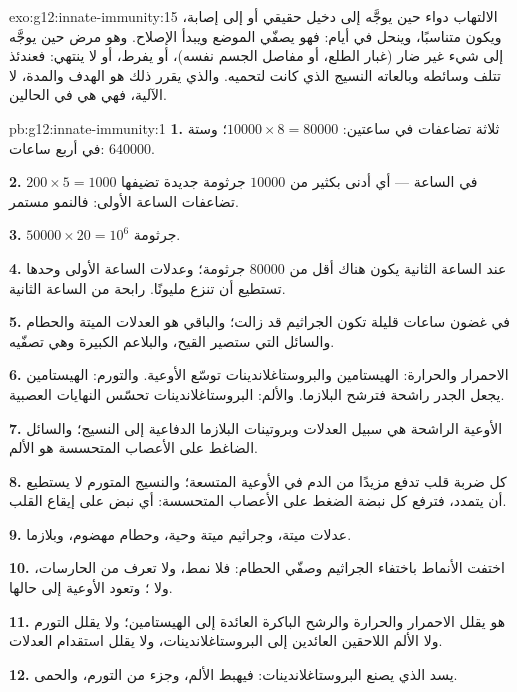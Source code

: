 \begin{solution}{exo:g12:innate-immunity:15}
الالتهاب دواء حين يوجَّه إلى دخيل حقيقي أو إلى إصابة، ويكون متناسبًا،
وينحل في أيام: فهو يصفّي الموضع ويبدأ الإصلاح. وهو مرض حين يوجَّه إلى
شيء غير ضار (غبار الطلع، أو مفاصل الجسم نفسه)، أو يفرط، أو لا ينتهي:
فعندئذ تتلف وسائطه وبالعاته النسيج الذي كانت لتحميه. والذي يقرر ذلك هو
الهدف والمدة، لا الآلية، فهي هي في الحالين.
\end{solution}

\begin{solution}{pb:g12:innate-immunity:1}
\textbf{1.} ثلاثة تضاعفات في ساعتين: $\num{10000} \times 8 =
\num{80000}$؛ وستة في أربع ساعات: $\num{640000}$.

\textbf{2.} $200 \times 5 = 1000$ في الساعة --- أي أدنى بكثير من
$\num{10000}$ جرثومة جديدة تضيفها تضاعفات الساعة الأولى: فالنمو
مستمر.

\textbf{3.} $\num{50000} \times 20 = 10^6$ جرثومة.

\textbf{4.} عند الساعة الثانية يكون هناك أقل من $\num{80000}$ جرثومة؛
وعدلات الساعة الأولى وحدها تستطيع أن تنزع مليونًا.  رابحة من
الساعة الثانية.

\textbf{5.} في غضون ساعات قليلة تكون الجراثيم قد زالت؛ والباقي هو
العدلات الميتة والحطام والسائل التي ستصير القيح، والبلاعم الكبيرة وهي
تصفّيه.

\textbf{6.} الاحمرار والحرارة: الهيستامين والبروستاغلاندينات توسّع
الأوعية. والتورم: الهيستامين يجعل الجدر راشحة فترشح البلازما.
والألم: البروستاغلاندينات تحسّس النهايات العصبية.

\textbf{7.} الأوعية الراشحة هي سبيل العدلات وبروتينات البلازما
الدفاعية إلى النسيج؛ والسائل الضاغط على الأعصاب المتحسسة هو الألم.

\textbf{8.} كل ضربة قلب تدفع مزيدًا من الدم في الأوعية المتسعة؛
والنسيج المتورم لا يستطيع أن يتمدد، فترفع كل نبضة الضغط على الأعصاب
المتحسسة: أي نبض على إيقاع القلب.

\textbf{9.} عدلات ميتة، وجراثيم ميتة وحية، وحطام مهضوم، وبلازما.

\textbf{10.} اختفت الأنماط باختفاء الجراثيم وصفّي الحطام: فلا نمط، ولا
تعرف من الحارسات، ولا ؛ وتعود الأوعية إلى حالها.

\textbf{11.} هو يقلل الاحمرار والحرارة والرشح الباكرة العائدة إلى
الهيستامين؛ ولا يقلل التورم ولا الألم اللاحقين العائدين إلى
البروستاغلاندينات، ولا يقلل استقدام العدلات.

\textbf{12.} يسد  الذي يصنع البروستاغلاندينات: فيهبط الألم،
وجزء من التورم، والحمى.


\end{solution}
